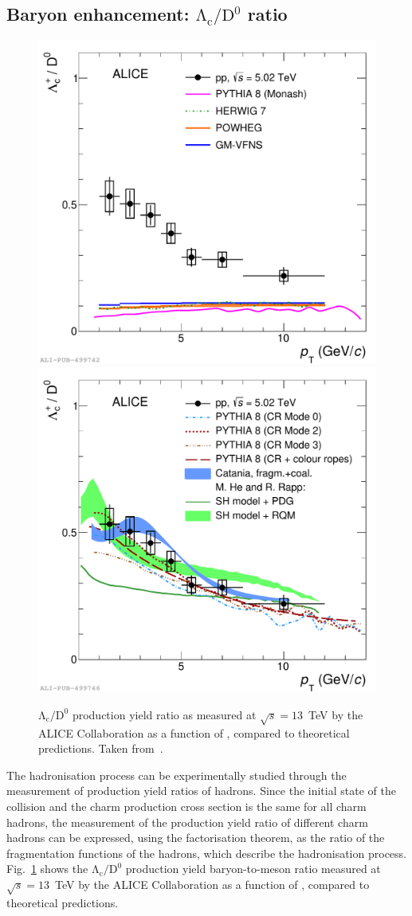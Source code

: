 \subsection{Baryon enhancement: \texorpdfstring{\boldmath$\mathrm{\Lambda_c/D^0}$}{Lc/D0} ratio}
\begin{figure}[htb]
    \centering
    \includegraphics[width=0.48\linewidth]{Figures/Chapter 2/LcD_models_withFFModels_ropes_2.pdf}
    \includegraphics[width=0.48\linewidth]{Figures/Chapter 2/LcD_models_withModifiedModels_ropes_coal_2.pdf}
    \caption{$\mathrm{\Lambda_c/D^0}$ production yield ratio as measured at $\sqrt{s} = 13$~TeV by the ALICE Collaboration as a function of \pt, compared to theoretical predictions. Taken from~\cite{ALICE:2020wla}.}
    \label{fig:Lambda_c_D0}
\end{figure}
The hadronisation process can be experimentally studied through the measurement of production yield ratios of hadrons. Since the initial state of the collision and the charm production cross section is the same for all charm hadrons, the measurement of the production yield ratio of different charm hadrons can be expressed, using the factorisation theorem, as the ratio of the fragmentation functions of the hadrons, which describe the hadronisation process. Fig.~\ref{fig:Lambda_c_D0} shows the $\mathrm{\Lambda_c/D^0}$ production yield baryon-to-meson ratio measured at $\sqrt{s} = 13$~TeV by the ALICE Collaboration as a function of \pt, compared to theoretical predictions. 

